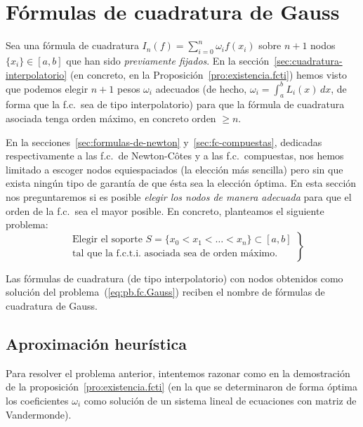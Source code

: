 \section{Fórmulas de cuadratura de Gauss}
\label{sec:fc-Gauss}
Sea una fórmula de cuadratura $I_n(f)=\sum_{i=0}^n \omega_i f(x_i)$
sobre $n+1$ nodos $\{x_i\}\in [a,b]$ que han sido \textit{previamente
  fijados}. En la sección~\ref{sec:cuadratura-interpolatorio} (en
concreto, en la Proposición~\ref{pro:existencia.fcti}) hemos visto que
podemos elegir $n+1$ pesos $\omega_i$ adecuados (de hecho,
$\omega_i=\int_a^b L_i(x)\, dx$, de forma que la f.c.\ sea de tipo
interpolatorio) para que la fórmula de cuadratura asociada tenga orden
máximo, en concreto orden $\ge n$.

En la secciones~\ref{sec:formulas-de-newton}
y~\ref{sec:fc-compuestas}, dedicadas respectivamente a las f.c.\ de
Newton-Côtes y a las f.c.\ compuestas, nos hemos limitado a escoger
nodos equiespaciados (la elección más sencilla) pero sin que exista
ningún tipo de garantía de que ésta sea la elección óptima. En esta
sección nos preguntaremos si es posible \textit{elegir los nodos de manera
adecuada} para que el orden de la f.c.\ sea el mayor posible. En
concreto, planteamos el siguiente problema:
\begin{equation}
\label{eq:pb.fc.Gauss}
\tag{P}
\left.
  \begin{aligned}
    &\text{Elegir el soporte $S=\{x_0<x_1<\dots<x_n\}\subset [a,b]$}
    \\
    &\text{tal que la f.c.t.i.\ asociada sea de orden máximo.}
  \end{aligned}
\right\}
\end{equation}

\begin{definition}
  Las fórmulas de cuadratura (de tipo interpolatorio) con nodos
  obtenidos como solución del problema~(\ref{eq:pb.fc.Gauss}) reciben
  el nombre de fórmulas de cuadratura de Gauss.
\end{definition}
\subsection*{Aproximación heurística}
Para resolver el problema anterior, intentemos razonar como en la
demostración de la proposición~\ref{pro:existencia.fcti} (en la que se
determinaron de forma óptima los coeficientes $\omega_i$ como solución
de un sistema lineal de ecuaciones con matriz de Vandermonde).


